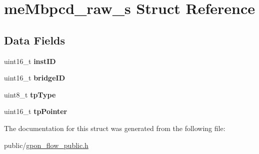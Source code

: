 \hypertarget{structmeMbpcd__raw__s}{}\section{me\+Mbpcd\+\_\+raw\+\_\+s Struct Reference}
\label{structmeMbpcd__raw__s}
\subsection*{Data Fields}
\begin{DoxyCompactItemize}
\item 
\mbox{\label{structmeMbpcd__raw__s_af809a0f6f3ad928f95e1f7f7cdcb13f9}} 
uint16\+\_\+t {\bfseries inst\+ID}
\item 
\mbox{\label{structmeMbpcd__raw__s_a453c6ad88accbf7032aa394e099d62f1}} 
uint16\+\_\+t {\bfseries bridge\+ID}
\item 
\mbox{\label{structmeMbpcd__raw__s_a499f7a33cd464e7e42dc97dbc69a54b3}} 
uint8\+\_\+t {\bfseries tp\+Type}
\item 
\mbox{\label{structmeMbpcd__raw__s_a25ab10257cdefe6e57afbc7b5c40e5af}} 
uint16\+\_\+t {\bfseries tp\+Pointer}
\end{DoxyCompactItemize}


The documentation for this struct was generated from the following file\+:\begin{DoxyCompactItemize}
\item 
public/\hyperlink{gpon__flow__public_8h}{gpon\+\_\+flow\+\_\+public.\+h}\end{DoxyCompactItemize}

